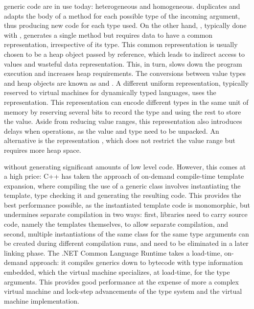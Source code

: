  generic code are in use today: heterogeneous and homogeneous.  duplicates and adapts the body of a method for each possible type of the incoming argument, thus producing new code for each type used. On the other hand, , typically done with , generates a single method but requires data to have a common representation, irrespective of its type. This common representation is usually chosen to be a heap object passed by reference, which leads to indirect access to values and wasteful data representation. This, in turn, slows down the program execution and increases heap requirements. The conversions between value types and heap objects are known as  and . A different uniform representation, typically reserved to virtual machines for dynamically typed languages, uses the  \cite{fixnums-lisp} representation. This representation can encode different types in the same unit of memory by reserving several bits to record the type and using the rest to store the value. Aside from reducing value ranges, this representation also introduces delays when  operations, as the value and type need to be unpacked. An alternative is the  representation \cite{tagged-unions-lua}, which does not restrict the value range but requires more heap space.

 without generating significant amounts of low level code. However, this comes at a high price: C++ has taken the approach of on-demand compile-time template expansion, where compiling the use of a generic class involves instantiating the template, type checking it and generating the resulting code. This provides the best performance possible, as the instantiated template code is monomorphic, but undermines separate compilation in two ways: first, libraries need to carry source code, namely the templates themselves, to allow separate compilation, and second, multiple instantiations of the same class for the same type arguments can be created during different compilation runs, and need to be eliminated in a later linking phase. The .NET Common Language Runtime takes a load-time, on-demand approach: it compiles generics down to bytecode with type information embedded, which the virtual machine specializes, at load-time, for the type arguments. This provides good performance at the expense of more a complex virtual machine and lock-step advancements of the type system and the virtual machine implementation.

